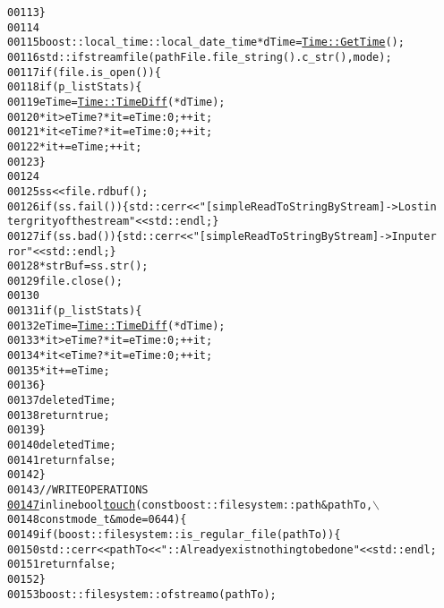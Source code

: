 \begin{footnotesize}
\begin{alltt}
00113         \}
00114 
00115         boost::local\_time::local\_date\_time *dTime = \hyperlink{group__libbuskol_ga6302b620351164dda28cc6d9d1b81aa5}{Time::GetTime}();
00116         std::ifstream file(pathFile.file\_string().c\_str(),mode);
00117         \textcolor{keywordflow}{if} (file.is\_open())\{
00118             \textcolor{keywordflow}{if} (p\_listStats)\{
00119                 eTime = \hyperlink{group__libbuskol_gac6d1980cc97a5c78f36a3fd96ceaa573}{Time::TimeDiff}( *dTime );
00120                 *it > eTime ? *it = eTime : 0;      ++it;
00121                 *it < eTime ? *it = eTime : 0;      ++it;
00122                 *it += eTime;                       ++it;
00123             \}
00124 
00125             ss << file.rdbuf();
00126                 \textcolor{keywordflow}{if} (ss.fail())\{ std::cerr<<\textcolor{stringliteral}{"[simpleReadToStringByStream]->Lost in
      tergrity of the stream"}<<std::endl; \}
00127                 \textcolor{keywordflow}{if} (ss.bad())\{ std::cerr<<\textcolor{stringliteral}{"[simpleReadToStringByStream]->Input er
      ror"}<<std::endl; \}
00128             *strBuf = ss.str();
00129             file.close();
00130 
00131             \textcolor{keywordflow}{if} (p\_listStats)\{
00132                 eTime = \hyperlink{group__libbuskol_gac6d1980cc97a5c78f36a3fd96ceaa573}{Time::TimeDiff}( *dTime );
00133                 *it > eTime ? *it = eTime : 0;      ++it;
00134                 *it < eTime ? *it = eTime : 0;      ++it;
00135                 *it += eTime;
00136             \}
00137             \textcolor{keyword}{delete} dTime;
00138             \textcolor{keywordflow}{return} \textcolor{keyword}{true};
00139         \}
00140         \textcolor{keyword}{delete} dTime;
00141         \textcolor{keywordflow}{return} \textcolor{keyword}{false};
00142     \}
00143     \textcolor{comment}{//WRITE OPERATIONS}
\hypertarget{myIO_8hpp_source_l00147}{}\hyperlink{group__libbuskol_ga5fb8ee7fb3a7ecec3502af64538cfc3c}{00147} \textcolor{comment}{}    \textcolor{keyword}{inline} \textcolor{keywordtype}{bool} \hyperlink{group__libbuskol_ga5fb8ee7fb3a7ecec3502af64538cfc3c}{touch}(\textcolor{keyword}{const} boost::filesystem::path &pathTo,\(\backslash\)
00148                       \textcolor{keyword}{const} mode\_t &mode =0644)\{
00149         \textcolor{keywordflow}{if} ( boost::filesystem::is\_regular\_file(pathTo) )\{
00150             std::cerr<<pathTo<<\textcolor{stringliteral}{"::Already exist nothing to be done"}<<std::endl;
00151             \textcolor{keywordflow}{return} \textcolor{keyword}{false};
00152         \}
00153         boost::filesystem::ofstream o (pathTo);

\end{alltt}
\end{footnotesize}
